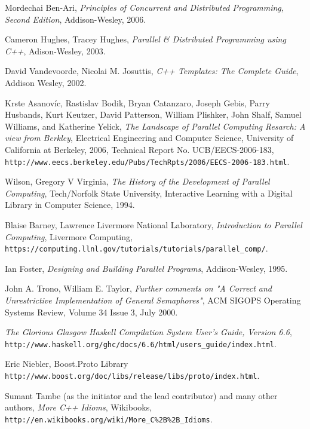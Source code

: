 
\begin{thebibliography}{99}

 Mordechai Ben-Ari, \textit{Principles of Concurrent and Distributed Programming,
  Second Edition}, Addison-Wesley, 2006.

 Cameron Hughes, Tracey Hughes, \textit{Parallel \& Distributed Programming using C++},
  Adison-Wesley, 2003.

 David Vandevoorde, Nicolai M. Josuttis, \textit{C++ Templates: The Complete Guide},
  Addison Wesley, 2002.

 Krste Asanovíc, Rastislav Bodik, Bryan Catanzaro, Joseph Gebis,
  Parry Husbands, Kurt Keutzer, David Patterson,
  William Plishker, John Shalf, Samuel Williams, and Katherine Yelick,
  \textit{The Landscape of Parallel Computing Resarch: A view from Berkley},
  Electrical Engineering and Computer Science, University of California at Berkeley, 2006,
  Technical Report No. UCB/EECS-2006-183,
  \texttt{http://www.eecs.berkeley.edu/Pubs/TechRpts/2006/EECS-2006-183.html}.

 Wilson, Gregory V Virginia, \textit{The History of the Development of Parallel Computing}, Tech/Norfolk State University, Interactive Learning with a Digital Library in Computer Science, 1994.

 Blaise Barney, Lawrence Livermore National Laboratory, \textit{Introduction to Parallel Computing}, Livermore Computing, \texttt{https://computing.llnl.gov/tutorials/tutorials/parallel\_comp/}.

 Ian Foster, \textit{Designing and Building Parallel Programs}, Addison-Wesley, 1995.

 John A. Trono,	William E. Taylor, \textit{Further comments on "A Correct and Unrestrictive Implementation of General Semaphores"}, ACM SIGOPS Operating Systems Review, Volume 34 Issue 3, July 2000.

 \textit{The Glorious Glasgow Haskell Compilation System User's Guide, Version 6.6}, \texttt{http://www.haskell.org/ghc/docs/6.6/html/users\_guide/index.html}.

 Eric Niebler, Boost.Proto Library \texttt{http://www.boost.org/doc/libs/release/libs/proto/index.html}.

 Sumant Tambe (as the initiator and the lead contributor) and many other authors, \textit{More C++ Idioms}, Wikibooks, \texttt{http://en.wikibooks.org/wiki/More_C\%2B\%2B_Idioms}.

\end{thebibliography}